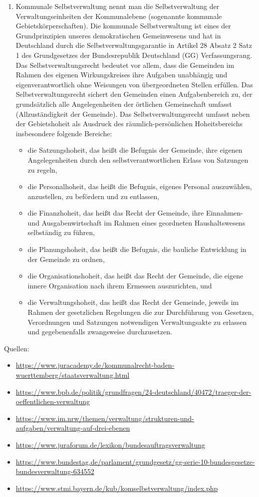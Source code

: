 \documentclass{article}
\begin{document}
\begin{enumerate}[label=(\alph*)]
		\item Kommunale Selbstverwaltung nennt man die Selbstverwaltung der Verwaltungseinheiten der Kommunalebene (sogenannte kommunale Gebietskörperschaften). Die kommunale Selbstverwaltung ist eines der Grundprinzipien unseres demokratischen Gemeinwesens und hat in Deutschland durch die Selbstverwaltungsgarantie in Artikel 28 Absatz 2 Satz 1 des Grundgesetzes der Bundesrepublik Deutschland (GG) Verfassungsrang. Das Selbstverwaltungsrecht bedeutet vor allem, dass die Gemeinden im Rahmen des eigenen Wirkungskreises ihre Aufgaben unabhängig und eigenverantwortlich ohne Weisungen von übergeordneten Stellen erfüllen. Das Selbstverwaltungsrecht sichert den Gemeinden einen Aufgabenbereich zu, der grundsätzlich alle Angelegenheiten der örtlichen Gemeinschaft umfasst (Allzuständigkeit der Gemeinde). Das Selbstverwaltungsrecht umfasst neben der Gebietshoheit als Ausdruck des räumlich-persönlichen Hoheitsbereichs insbesondere folgende Bereiche:
		\begin{itemize}
			\item die Satzungshoheit, das heißt die Befugnis der Gemeinde, ihre eigenen Angelegenheiten durch den selbstverantwortlichen Erlass von Satzungen zu regeln,
			\item die Personalhoheit, das heißt die Befugnis, eigenes Personal auszuwählen, anzustellen, zu befördern und zu entlassen,
			\item die Finanzhoheit, das heißt das Recht der Gemeinde, ihre Einnahmen- und Ausgabenwirtschaft im Rahmen eines geordneten Haushaltswesens selbständig zu führen,
			\item die Planungshoheit, das heißt die Befugnis, die bauliche Entwicklung in der Gemeinde zu ordnen,
			\item die Organisationshoheit, das heißt das Recht der Gemeinde, die eigene innere Organisation nach ihrem Ermessen auszurichten, und
			\item die Verwaltungshoheit, das heißt das Recht der Gemeinde, jeweils im Rahmen der gesetzlichen Regelungen die zur Durchführung von Gesetzen, Verordnungen und Satzungen notwendigen Verwaltungsakte zu erlassen und gegebenenfalls zwangsweise durchzusetzen.
		\end{itemize}
	\end{enumerate}

	Quellen:
	\begin{itemize}
		\item \url{https://www.juracademy.de/kommunalrecht-baden-wuerttemberg/staatsverwaltung.html}
		\item \url{https://www.bpb.de/politik/grundfragen/24-deutschland/40472/traeger-der-oeffentlichen-verwaltung}
		\item \url{https://www.im.nrw/themen/verwaltung/strukturen-und-aufgaben/verwaltung-auf-drei-ebenen}
		\item \url{https://www.juraforum.de/lexikon/bundesauftragsverwaltung}
		\item \url{https://www.bundestag.de/parlament/grundgesetz/gg-serie-10-bundesgesetze-bundesverwaltung-634552}
		\item \url{https://www.stmi.bayern.de/kub/komselbstverwaltung/index.php}
	\end{itemize}
	
\end{document}
